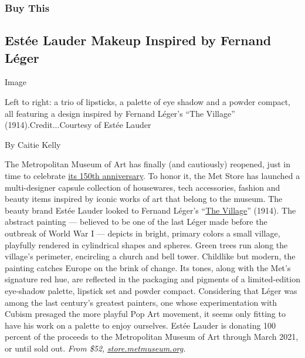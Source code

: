 \hypertarget{buy-this}{%
\subsubsection{Buy This}\label{buy-this}}

\hypertarget{estuxe9e-lauder-makeup-inspired-by-fernand-luxe9ger}{%
\subsection{Estée Lauder Makeup Inspired by Fernand
Léger}\label{estuxe9e-lauder-makeup-inspired-by-fernand-luxe9ger}}

Image

Left to right: a trio of lipsticks, a palette of eye shadow and a powder
compact, all featuring a design inspired by Fernand Léger's ``The
Village'' (1914).Credit...Courtesy of Estée Lauder

By Caitie Kelly

The Metropolitan Museum of Art has finally (and cautiously) reopened,
just in time to celebrate
\href{https://www.nytimes3xbfgragh.onion/2020/08/27/arts/design/met-museum-reopens-anniversary.html}{its
150th anniversary}. To honor it, the Met Store has launched a
multi-designer capsule collection of housewares, tech accessories,
fashion and beauty items inspired by iconic works of art that belong to
the museum. The beauty brand Estée Lauder looked to Fernand Léger's
``\href{https://www.metmuseum.org/art/collection/search/500488}{The
Village}'' (1914). The abstract painting --- believed to be one of the
last Léger made before the outbreak of World War I --- depicts in
bright, primary colors a small village, playfully rendered in
cylindrical shapes and spheres. Green trees run along the village's
perimeter, encircling a church and bell tower. Childlike but modern, the
painting catches Europe on the brink of change. Its tones, along with
the Met's signature red hue, are reflected in the packaging and pigments
of a limited-edition eye-shadow palette, lipstick set and powder
compact. Considering that Léger was among the last century's greatest
painters, one whose experimentation with Cubism presaged the more
playful Pop Art movement, it seems only fitting to have his work on a
palette to enjoy ourselves. Estée Lauder is donating 100 percent of the
proceeds to the Metropolitan Museum of Art through March 2021, or until
sold out. \emph{From \$52,}
\href{https://store.metmuseum.org/150/collaborations?more_ways_to_shop=1240}{\emph{store.metmuseum.org}}\emph{.}

